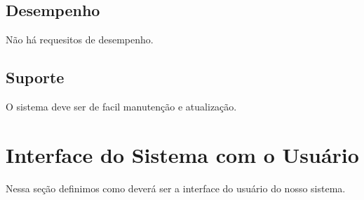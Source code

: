 \documentclass[11pt, a4paper]{article}
\begin{document}
		
		\subsection{Desempenho}
			Não há requesitos de desempenho. 
		
		\subsection{Suporte}
			O sistema deve ser de facil manutenção e atualização.
		
	\section{Interface do Sistema com o Usuário}
		Nessa seção definimos como deverá ser a interface do usuário do nosso sistema.
		
\end{document}
